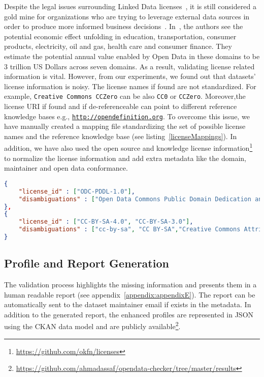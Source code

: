 Despite the legal issues surrounding Linked Data licenses~\cite{Prateek:Misc:13}, it is still considered a gold mine for organizations who are trying to leverage external data sources in order to produce more informed business decisions~\cite{Boyd:Article:11}. In~\cite{Manyika:Report:13}, the authors see the potential economic effect unfolding in education, transportation, consumer products, electricity, oil and gas, health care and consumer finance. They estimate the potential annual value enabled by Open Data in these domains to be 3 trillion US Dollars across seven domains. As a result, validating license related information is vital. However, from our experiments, we found out that datasets' license information is noisy. The license names if found are not standardized. For example, \texttt{Creative Commons CCZero} can be also \texttt{CC0} or \texttt{CCZero}. Moreover,the license URI if found and if de-referenceable can point to different reference knowledge bases e.g., \texttt{\url{http://opendefinition.org}}. To overcome this issue, we have manually created a mapping file standardizing the set of possible license names and the reference knowledge base (see listing~\ref{licenseMappings}). In addition, we have also used the open source and knowledge license information\footnote{\url{https://github.com/okfn/licenses}} to normalize the license information and add extra metadata like the domain, maintainer and open data conformance.

\begin{lstlisting}[language=json]
{
	"license_id" : ["ODC-PDDL-1.0"],
	"disambiguations" : ["Open Data Commons Public Domain Dedication and License (PDDL)"]
},
{
	"license_id" : ["CC-BY-SA-4.0", "CC-BY-SA-3.0"],
	"disambiguations" : ["cc-by-sa", "CC BY-SA","Creative Commons Attribution Share-Alike"]
}
\end{lstlisting}

\subsection{Profile and Report Generation}
The validation process highlights the missing information and presents them in a human readable report (see appendix~\ref{appendix:appendixE}). The report can be automatically sent to the dataset maintainer email if exists in the metadata. In addition to the generated report, the enhanced profiles are represented in JSON using the CKAN data model and are publicly available\footnote{\url{https://github.com/ahmadassaf/opendata-checker/tree/master/results}}.

